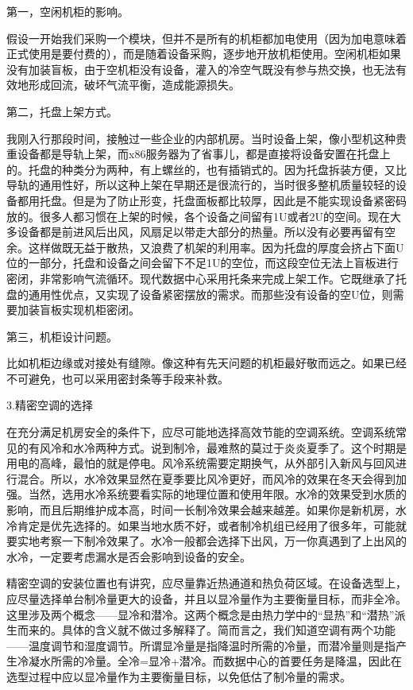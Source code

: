 \documentclass[12pt,UTF8]{ctexbook}
\begin{document}
第一，空闲机柜的影响。

假设一开始我们采购一个模块，但并不是所有的机柜都加电使用（因为加电意味着正式使用是要付费的），而是随着设备采购，逐步地开放机柜使用。空闲机柜如果没有加装盲板，由于空机柜没有设备，灌入的冷空气既没有参与热交换，也无法有效地形成回流，破坏气流平衡，造成能源损失。

第二，托盘上架方式。

我刚入行那段时间，接触过一些企业的内部机房。当时设备上架，像小型机这种贵重设备都是导轨上架，而x86服务器为了省事儿，都是直接将设备安置在托盘上的。托盘的种类分为两种，有上螺丝的，也有插销式的。因为托盘拆装方便，又比导轨的通用性好，所以这种上架在早期还是很流行的，当时很多整机质量较轻的设备都用托盘。但是为了防止形变，托盘面板都比较厚，因此是不能实现设备紧密码放的。很多人都习惯在上架的时候，各个设备之间留有1U或者2U的空间。现在大多设备都是前进风后出风，风扇足以带走大部分的热量。所以没有必要再留有空余。这样做既无益于散热，又浪费了机架的利用率。因为托盘的厚度会挤占下面U位的一部分，托盘和设备之间会留下不足1U的空位，而这段空位无法上盲板进行密闭，非常影响气流循环。现代数据中心采用托条来完成上架工作。它既继承了托盘的通用性优点，又实现了设备紧密摆放的需求。而那些没有设备的空U位，则需要加装盲板实现机柜密闭。

第三，机柜设计问题。

比如机柜边缘或对接处有缝隙。像这种有先天问题的机柜最好敬而远之。如果已经不可避免，也可以采用密封条等手段来补救。

3.精密空调的选择

在充分满足机房安全的条件下，应尽可能地选择高效节能的空调系统。空调系统常见的有风冷和水冷两种方式。说到制冷，最难熬的莫过于炎炎夏季了。这个时期是用电的高峰，最怕的就是停电。风冷系统需要定期换气，从外部引入新风与回风进行混合。所以，水冷效果显然在夏季要比风冷更好，而风冷的效果在冬天会得到加强。当然，选用水冷系统要看实际的地理位置和使用年限。水冷的效果受到水质的影响，而且后期维护成本高，时间一长制冷效果会越来越差。如果你是新机房，水冷肯定是优先选择的。如果当地水质不好，或者制冷机组已经用了很多年，可能就要实地考察一下制冷效果了。水冷一般都会选择下出风，万一你真遇到了上出风的水冷，一定要考虑漏水是否会影响到设备的安全。

精密空调的安装位置也有讲究，应尽量靠近热通道和热负荷区域。在设备选型上，应尽量选择单台制冷量更大的设备，并且以显冷量作为主要衡量目标，而非全冷。这里涉及两个概念——显冷和潜冷。这两个概念是由热力学中的“显热”和“潜热”派生而来的。具体的含义就不做过多解释了。简而言之，我们知道空调有两个功能——温度调节和湿度调节。所谓显冷量是指降温时所需的冷量，而潜冷量则是指产生冷凝水所需的冷量。全冷=显冷+潜冷。而数据中心的首要任务是降温，因此在选型过程中应以显冷量作为主要衡量目标，以免低估了制冷量的需求。
\end{document}
